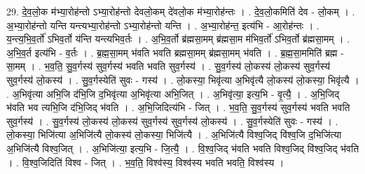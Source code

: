 \documentclass[17pt]{extarticle}
\begin{document}
29. दे॒व॒लो॒क म॑भ्या॒रोह॑न्तो ऽभ्या॒रोह॑न्तो देवलो॒कम् दे॑वलो॒क म॑भ्या॒रोह॑न्तः । . दे॒व॒लो॒कमिति॑ देव - लो॒कम् । . अ॒भ्या॒रोह॑न्तो यन्ति यन्त्यभ्या॒रोह॑न्तो ऽभ्या॒रोह॑न्तो यन्ति । . अ॒भ्या॒रोह॑न्त॒ इत्य॑भि - आ॒रोह॑न्तः । . य॒न्त्य॒भि॒व॒र्तो॑ ऽभिव॒र्तो य॑न्ति यन्त्यभिव॒र्तः । . अ॒भि॒व॒र्तो ब्र॑ह्मसा॒मम् ब्र॑ह्मसा॒म म॑भिव॒र्तो॑ ऽभिव॒र्तो ब्र॑ह्मसा॒मम् । . अ॒भि॒व॒र्त इत्य॑भि - व॒र्तः । . ब्र॒ह्म॒सा॒मम् भ॑वति भवति ब्रह्मसा॒मम् ब्र॑ह्मसा॒मम् भ॑वति । . ब्र॒ह्म॒सा॒ममिति॑ ब्रह्म - सा॒मम् । . भ॒व॒ति॒ सु॒व॒र्गस्य॑ सुव॒र्गस्य॑ भवति भवति सुव॒र्गस्य॑ । . सु॒व॒र्गस्य॑ लो॒कस्य॑ लो॒कस्य॑ सुव॒र्गस्य॑ सुव॒र्गस्य॑ लो॒कस्य॑ । . सु॒व॒र्गस्येति॑ सुवः - गस्य॑ । . लो॒कस्या॒ भिवृ॑त्या अ॒भिवृ॑त्यै लो॒कस्य॑ लो॒कस्या॒ भिवृ॑त्यै । . अ॒भिवृ॑त्या अभि॒जि द॑भि॒जि द॒भिवृ॑त्या अ॒भिवृ॑त्या अभि॒जित् । . अ॒भिवृ॑त्या॒ इत्य॒भि - वृ॒त्यै॒ । . अ॒भि॒जिद् भ॑वति भव त्यभि॒जि द॑भि॒जिद् भ॑वति । . अ॒भि॒जिदित्य॑भि - जित् । . भ॒व॒ति॒ सु॒व॒र्गस्य॑ सुव॒र्गस्य॑ भवति भवति सुव॒र्गस्य॑ । . सु॒व॒र्गस्य॑ लो॒कस्य॑ लो॒कस्य॑ सुव॒र्गस्य॑ सुव॒र्गस्य॑ लो॒कस्य॑ । . सु॒व॒र्गस्येति॑ सुवः - गस्य॑ । . लो॒कस्या॒ भिजि॑त्या अ॒भिजि॑त्यै लो॒कस्य॑ लो॒कस्या॒ भिजि॑त्यै । . अ॒भिजि॑त्यै विश्व॒जिद् वि॑श्व॒जि द॒भिजि॑त्या अ॒भिजि॑त्यै विश्व॒जित् । . अ॒भिजि॑त्या॒ इत्य॒भि - जि॒त्यै॒ । . वि॒श्व॒जिद् भ॑वति भवति विश्व॒जिद् वि॑श्व॒जिद् भ॑वति । . वि॒श्व॒जिदिति॑ विश्व - जित् । . भ॒व॒ति॒ विश्व॑स्य॒ विश्व॑स्य भवति भवति॒ विश्व॑स्य । \newline
\end{document}
